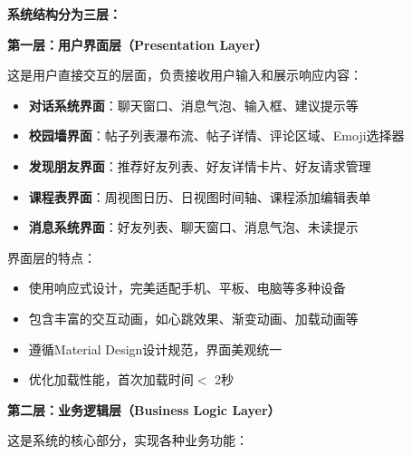 \documentclass[12pt,a4paper]{article}
\begin{document}
\textbf{系统结构分为三层：}

\vspace{0.3cm}
\noindent\textbf{第一层：用户界面层（Presentation Layer）}

这是用户直接交互的层面，负责接收用户输入和展示响应内容：

\begin{itemize}
    \item \textbf{对话系统界面}：聊天窗口、消息气泡、输入框、建议提示等
    \item \textbf{校园墙界面}：帖子列表瀑布流、帖子详情、评论区域、Emoji选择器
    \item \textbf{发现朋友界面}：推荐好友列表、好友详情卡片、好友请求管理
    \item \textbf{课程表界面}：周视图日历、日视图时间轴、课程添加编辑表单
    \item \textbf{消息系统界面}：好友列表、聊天窗口、消息气泡、未读提示
\end{itemize}

界面层的特点：
\begin{itemize}
    \item 使用响应式设计，完美适配手机、平板、电脑等多种设备
    \item 包含丰富的交互动画，如心跳效果、渐变动画、加载动画等
    \item 遵循Material Design设计规范，界面美观统一
    \item 优化加载性能，首次加载时间$<$ 2秒
\end{itemize}

\vspace{0.3cm}
\noindent\textbf{第二层：业务逻辑层（Business Logic Layer）}

这是系统的核心部分，实现各种业务功能：
\end{document}
